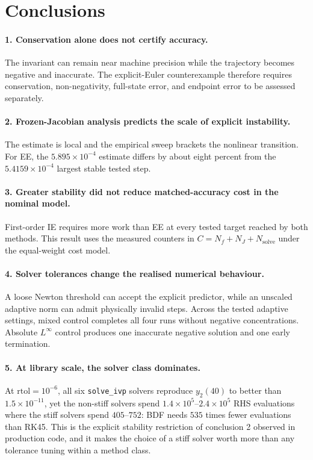 \section{Conclusions}
\paragraph{1. Conservation alone does not certify accuracy.} The invariant can remain near machine precision while the trajectory becomes negative and inaccurate. The explicit-Euler counterexample therefore requires conservation, non-negativity, full-state error, and endpoint error to be assessed separately.

\paragraph{2. Frozen-Jacobian analysis predicts the scale of explicit instability.} The estimate is local and the empirical sweep brackets the nonlinear transition. For EE, the $5.895\times10^{-4}$ estimate differs by about eight percent from the $5.4159\times10^{-4}$ largest stable tested step.

\paragraph{3. Greater stability did not reduce matched-accuracy cost in the nominal model.} First-order IE requires more work than EE at every tested target reached by both methods. This result uses the measured counters in $C=N_f+N_J+N_{\mathrm{solve}}$ under the equal-weight cost model.

\paragraph{4. Solver tolerances change the realised numerical behaviour.} A loose Newton threshold can accept the explicit predictor, while an unscaled adaptive norm can admit physically invalid steps. Across the tested adaptive settings, mixed control completes all four runs without negative concentrations. Absolute $L^\infty$ control produces one inaccurate negative solution and one early termination.

\paragraph{5. At library scale, the solver class dominates.} At $\mathrm{rtol}=10^{-6}$, all six \texttt{solve\_ivp} solvers reproduce $y_2(40)$ to better than $1.5\times10^{-11}$, yet the non-stiff solvers spend $1.4\times10^{5}$--$2.4\times10^{5}$ RHS evaluations where the stiff solvers spend $405$--$752$: BDF needs $535$ times fewer evaluations than RK45. This is the explicit stability restriction of conclusion 2 observed in production code, and it makes the choice of a stiff solver worth more than any tolerance tuning within a method class.

